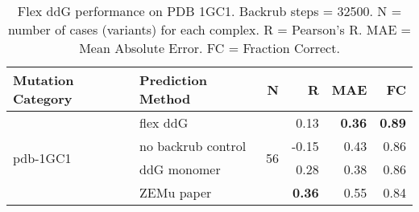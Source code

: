 \begin{table}
  \begin{tabular}{llrrrr}
\toprule
Mutation Category &   Prediction Method &   N &     R &  MAE &   FC \\
\midrule
 \multirow{ 4}{*}{pdb-1GC1} & flex ddG & \multirow{ 4}{*}{56} & 0.13 & \textbf{0.36} & \textbf{0.89}  \\
 & no backrub control & & -0.15 & 0.43 & 0.86  \\
 & ddG monomer & & 0.28 & 0.38 & 0.86  \\
 & ZEMu paper & & \textbf{0.36} & 0.55 & 0.84  \\
\bottomrule
\end{tabular}
  \caption[Flex ddG performance on PDB 1GC1]{
    Flex ddG performance on PDB 1GC1. Backrub steps = 32500. N = number of cases (variants) for each complex. R = Pearson's R. MAE = Mean Absolute Error. FC = Fraction Correct.
  } \label{tab:table-pdb-1GC1}
\end{table}
